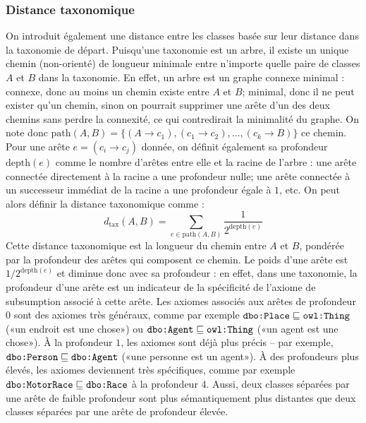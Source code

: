 \subsubsection{Distance taxonomique}
On introduit également une distance entre les classes basée sur leur distance dans la taxonomie de départ. Puisqu'une taxonomie est un arbre, il existe un unique chemin (non-orienté) de longueur minimale entre n'importe quelle paire de classes $A$ et $B$ dans la taxonomie. En effet, un arbre est un graphe connexe minimal : connexe, donc au moins un chemin existe entre $A$ et $B$; minimal, donc il ne peut exister qu'un chemin, sinon on pourrait supprimer une arête d'un des deux chemins sans perdre la connexité, ce qui contredirait la minimalité du graphe. On note donc $\text{path}(A, B) = \{(A \rightarrow c_1), (c_1 \rightarrow c_2), \ldots, (c_k \rightarrow B)\}$ ce chemin. Pour une arête $e = (c_i \rightarrow c_j)$ donnée, on définit également sa profondeur $\text{depth}(e)$ comme le nombre d'arêtes entre elle et la racine de l'arbre : une arête connectée directement à la racine a une profondeur nulle; une arête connectée à un successeur immédiat de la racine a une profondeur égale à $1$, etc.
On peut alors définir la distance taxonomique comme :
\begin{equation}
    d_\text{tax}(A, B) = \sum_{e \in \text{path}(A, B)} \frac{1}{\displaystyle 2^{\text{depth}(e)}}
\end{equation}
Cette distance taxonomique est la longueur du chemin entre $A$ et $B$, pondérée par la profondeur des arêtes qui composent ce chemin. Le poids d'une arête est $1/2^{\text{depth}(e)}$ et diminue donc avec sa profondeur : en effet, dans une taxonomie, la profondeur d'une arête est un indicateur de la spécificité de l'axiome de subsumption associé à cette arête. Les axiomes associés aux arêtes de profondeur $0$ sont des axiomes très généraux, comme par exemple $\texttt{dbo:Place} \sqsubseteq \texttt{owl:Thing}$ («un endroit est une chose») ou $\texttt{dbo:Agent} \sqsubseteq \texttt{owl:Thing}$ («un agent est une chose»). À la profondeur $1$, les axiomes sont déjà plus précis – par exemple, $\texttt{dbo:Person}\sqsubseteq \texttt{dbo:Agent}$ («une personne est un agent»). À des profondeurs plus élevés, les axiomes deviennent très spécifiques, comme par exemple $\texttt{dbo:MotorRace} \sqsubseteq \texttt{dbo:Race}$ à la profondeur $4$. Aussi, deux classes séparées par une arête de faible profondeur sont plus sémantiquement plus distantes que deux classes séparées par une arête de profondeur élevée.

